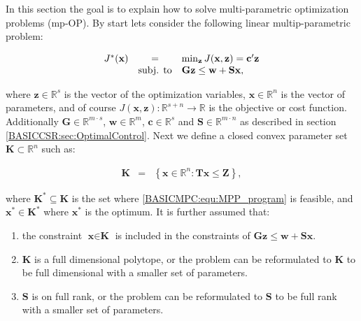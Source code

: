     In this section the goal is to explain how to solve multi-parametric optimization problems (mp-OP). By start lets consider the following linear multip-parametric problem:

        \begin{equation}
    \begin{array}{rcl}
            J^*(\textbf{x})&=&\min_{\textbf{z}}J(\textbf{x},\textbf{z})=\textbf{c}'\textbf{z}\\
            &\textnormal{subj. to}&\textbf{Gz}\leq\textbf{w}+\textbf{Sx},
        \end{array}
        \label{BASICMPC:equ:MPP_program}
    \end{equation}

    where $\textbf{z}\in\mathbb{R}^s$ is the vector of the optimization variables,  $\textbf{x}\in\mathbb{R}^n$ is the vector of parameters, and of course $J(\textbf{x},\textbf{z}):\mathbb{R}^{s+n}\rightarrow\mathbb{R}$ is the objective or cost function. Additionally $\textbf{G}\in\mathbb{R}^{m\cdot s}$, $\textbf{w}\in\mathbb{R}^m$, $\textbf{c}\in\mathbb{R}^s$ and $\textbf{S}\in\mathbb{R}^{m\cdot n}$ as described in section \ref{BASICCSR:sec:OptimalControl}. Next we define a closed convex parameter set $\textbf{K}\subset\mathbb{R}^n$ such as:

    \begin{equation}
    \begin{array}{rcl}
            \textbf{K}&=&\left\{ \textbf{x}\in\mathbb{R}^n:\textbf{Tx}\leq\textbf{Z}\right\},
        \end{array}
        \label{BASICMPC:equ:MPP_parameterset}
    \end{equation}

    where $\textbf{K}^*\subseteq\textbf{K}$ is the set where \ref{BASICMPC:equ:MPP_program} is feasible, and $\textbf{x}^*\in\textbf{K}^*$ where $\textbf{x}^*$ is the optimum. It is further assumed that:

    \begin{enumerate}
    \item the constraint $\textbf{x}\in\textbf{K}$ is included in the constraints of $\textbf{Gz}\leq\textbf{w}+\textbf{Sx}$.
    \item $\textbf{K}$ is a full dimensional polytope, or the problem can be reformulated to $\textbf{K}$ to be full dimensional with a smaller set of parameters.
    \item $\textbf{S}$ is on full rank, or the problem can be reformulated to $\textbf{S}$ to be full rank with a smaller set of parameters.
    \end{enumerate}

